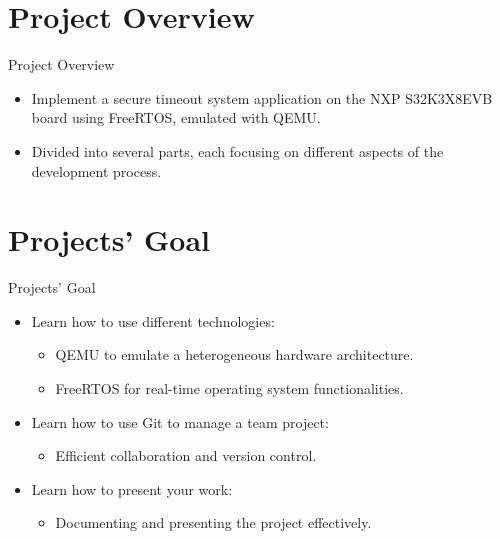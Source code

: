 \section{Project Overview}

\begin{frame}{Project Overview}
    \begin{itemize}
        \item Implement a secure timeout system application on the NXP S32K3X8EVB board using FreeRTOS, emulated with QEMU.
        \item Divided into several parts, each focusing on different aspects of the development process.
    \end{itemize}
\end{frame}

\section{Projects’ Goal}

\begin{frame}{Projects’ Goal}
    \begin{itemize}
        \item Learn how to use different technologies:
        \begin{itemize}
            \item QEMU to emulate a heterogeneous hardware architecture.
            \item FreeRTOS for real-time operating system functionalities.
        \end{itemize}
        \item Learn how to use Git to manage a team project:
        \begin{itemize}
            \item Efficient collaboration and version control.
        \end{itemize}
        \item Learn how to present your work:
        \begin{itemize}
            \item Documenting and presenting the project effectively.
        \end{itemize}
    \end{itemize}
\end{frame}
